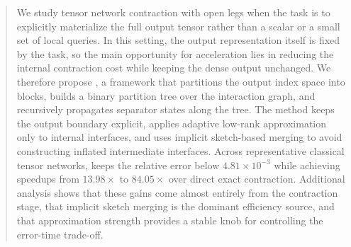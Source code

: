 \begin{abstract}
We study tensor network contraction with open legs when the task is to explicitly materialize the full output tensor rather than a scalar or a small set of local queries. In this setting, the output representation itself is fixed by the task, so the main opportunity for acceleration lies in reducing the internal contraction cost while keeping the dense output unchanged. We therefore propose \method{}, a framework that partitions the output index space into blocks, builds a binary partition tree over the interaction graph, and recursively propagates separator states along the tree. The method keeps the output boundary explicit, applies adaptive low-rank approximation only to internal interfaces, and uses implicit sketch-based merging to avoid constructing inflated intermediate interfaces. Across representative classical tensor networks, \method{} keeps the relative error below $4.81\times 10^{-3}$ while achieving speedups from $13.98\times$ to $84.05\times$ over direct exact contraction. Additional analysis shows that these gains come almost entirely from the contraction stage, that implicit sketch merging is the dominant efficiency source, and that approximation strength provides a stable knob for controlling the error-time trade-off.
\end{abstract}
